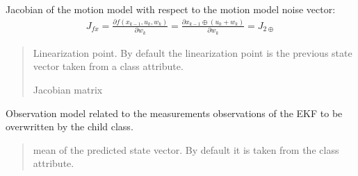 \documentclass[letterpaper,10pt,english]{sphinxmanual}
\begin{document}
\begin{fulllineitems}
\begin{fulllineitems}
\label{\detokenize{GFLocalization:EKF_4DOFAUV_InputVelocityMM_DVLDepthYawOM.EKF_4DOFAUV_InputVelocityMM_DVLDepthYawOM.Jfw}}
\pysigstartsignatures
{}
\pysigstopsignatures
\sphinxAtStartPar
Jacobian of the motion model with respect to the motion model noise vector:
\begin{equation}\label{equation:GFLocalization:eq-Jfw-EKF_4DOFAUV_VelocityMM_DVLDepthYawOM}
\begin{split}J_{fx}=\frac{\partial f(x_{k-1},u_k,w_k)}{\partial w_k} = \frac{\partial x_{k-1} \oplus (u_k + w_k)}{\partial w_k} = J_{2\oplus}\end{split}
\end{equation}\begin{quote}\begin{description}
\sphinxAtStartPar
{} \textendash{} Linearization point. By default the linearization point is the previous state vector taken from a class attribute.

\sphinxAtStartPar
Jacobian matrix

\end{description}\end{quote}

\end{fulllineitems}


\begin{fulllineitems}
\label{\detokenize{GFLocalization:EKF_4DOFAUV_InputVelocityMM_DVLDepthYawOM.EKF_4DOFAUV_InputVelocityMM_DVLDepthYawOM.hm}}
\pysigstartsignatures
{}
\pysigstopsignatures
\sphinxAtStartPar
Observation model related to the measurements observations of the EKF to be overwritten by the child class.
\begin{quote}\begin{description}
\sphinxAtStartPar
{} \textendash{} mean of the predicted state vector. By default it is taken from the class attribute.


\end{description}
\end{quote}
\end{fulllineitems}
\end{fulllineitems}
\end{document}
